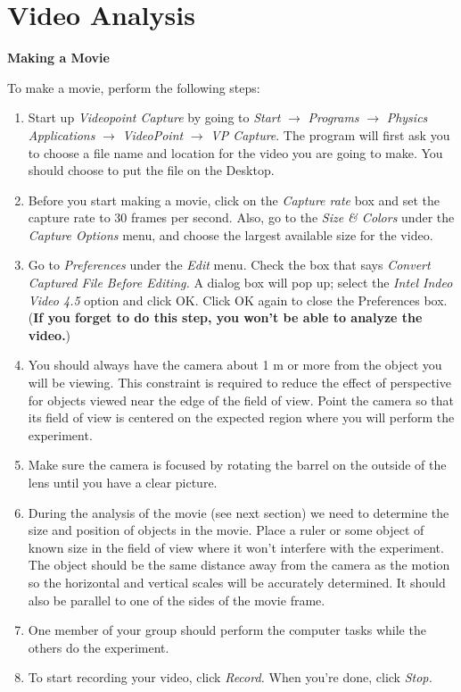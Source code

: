 
\section{Video Analysis}

\textbf{Making a Movie} 

To make a movie, perform the following steps:

\begin{enumerate}
\item Start up \textit{Videopoint Capture} by
going to \textit{Start} $\rightarrow$ \textit{Programs} $\rightarrow$
\textit{Physics Applications} $\rightarrow$ \textit{VideoPoint}
$\rightarrow$ \textit{VP Capture}.
The program will first ask you to choose a file name and location for the 
video you are going to make.  You should choose to put the file
on the Desktop.

\item Before you start making a movie, click on the \textit{Capture rate}
box and set the capture rate to 30 frames per second.  Also, go to the
\textit{Size \& Colors} under the \textit{Capture Options} 
menu, and choose
the largest available size for the video.

\item Go to \textit{Preferences} under the \textit{Edit} menu.  Check the box
that says \textit{Convert Captured File Before Editing.}  A dialog box will
pop up; select the \textit{Intel Indeo Video 4.5} option and
click OK.  Click OK again to close the Preferences box.
(\textbf{If you forget to do this step, you won't be able to analyze
the video.})


\item You should always have the camera about 1 m or more from the object
you will be viewing. This constraint is required to reduce the effect
of perspective for objects viewed near the edge of the field of view.
Point the camera so that its field of view is centered on the expected
region where you will perform the experiment. 
\item Make sure the camera is focused by rotating the barrel on the outside
of the lens until you have a clear picture.
\item During the analysis of the movie (see next section) we need to determine
the size and position of objects in the movie. Place a ruler or some
object of known size in the field of view where it won't interfere
with the experiment. The object should be the same distance away from
the camera as the motion so the horizontal and vertical scales will
be accurately determined. It should also be parallel to one of the
sides of the movie frame.
\item One member of your group should perform the computer tasks while the
others do the experiment. 
\item To start recording your video, click \textit{Record.}  When
you're done, click \textit{Stop.}


\end{enumerate}
